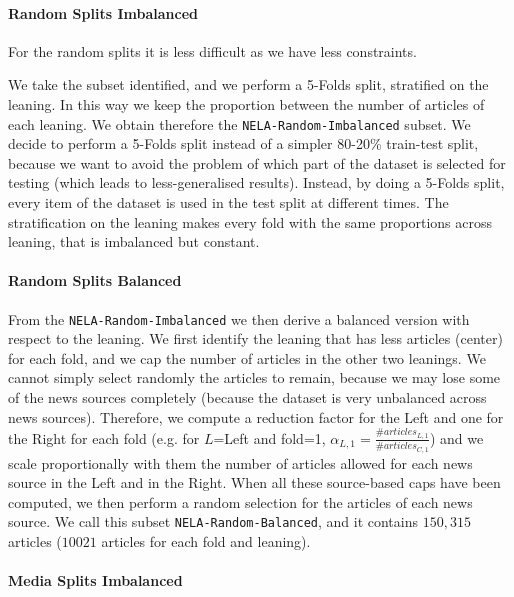 \paragraph{Random Splits Imbalanced}

For the random splits it is less difficult as we have less constraints.

We take the subset identified, and we perform a 5-Folds split, stratified on the leaning. In this way we keep the proportion between the number of articles of each leaning. We obtain therefore the \texttt{NELA-Random-Imbalanced} subset.
We decide to perform a 5-Folds split instead of a simpler 80-20\% train-test split, because we want to avoid the problem of which part of the dataset is selected for testing (which leads to less-generalised results).
Instead, by doing a 5-Folds split, every item of the dataset is used in the test split at different times.
The stratification on the leaning makes every fold with the same proportions across leaning, that is imbalanced but constant.

\paragraph{Random Splits Balanced}

From the \texttt{NELA-Random-Imbalanced} we then derive a balanced version with respect to the leaning. We first identify the leaning that has less articles (center) for each fold, and we cap the number of articles in the other two leanings.
We cannot simply select randomly the articles to remain, because we may lose some of the news sources completely (because the dataset is very unbalanced across news sources).
Therefore, we compute a reduction factor for the Left and one for the Right for each fold (e.g. for $L$=Left and fold=1, $\alpha_{L,1} = \frac{\#articles_{L,1}}{\#articles_{C,1}}$) and we scale proportionally with them the number of articles allowed for each news source in the Left and in the Right. When all these source-based caps have been computed, we then perform a random selection for the articles of each news source.  
We call this subset \texttt{NELA-Random-Balanced}, and it contains $150,315$ articles ($10021$ articles for each fold and leaning).

\paragraph{Media Splits Imbalanced}

